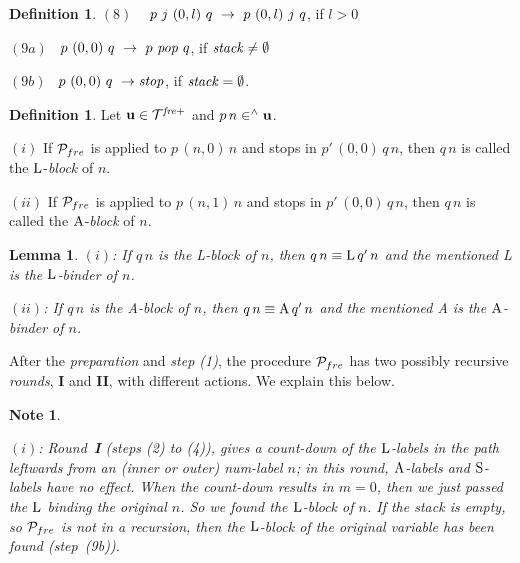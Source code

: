 \documentclass{article}
\theoremstyle{plain}
\newtheorem{Lem}[The]{Lemma}
\newtheorem{Note}[The]{Note}
\theoremstyle{definition}
\newtheorem{Def}[The]{Definition}
\begin{document}
{\begin{Def}
$(8)$ ~ $p ~ j ~ (0,l) ~ q ~ \rightarrow ~ p ~ (0,l) ~ j ~ q$, if $l > 0$

$(9a)$ \, $p ~ (0,0)  ~ q ~ \rightarrow ~ p ~ {\it pop}  ~ q$, if  ${\it stack} \not = \emptyset$

$(9b)$ \, $p ~ (0,0) ~ q ~ \rightarrow {\it stop}$, if ${\it stack} = \emptyset$.

\end{Def}




\begin{Def}\label{DefALBlo}
Let ${\bf u} \in {\cal T}^{\it fre+}$ and $p \, n \in^\wedge {\bf u}$.

$(i)$ If ${\cal P}_{fre}$ is applied to $p \, (n,0) \, n$ and stops in $p' \, (0,0) \, q \, n$, then $q \, n$ is called the ${\rm L}$-{\it block\/} of $n$.

$(ii)$ If ${\cal P}_{fre}$ is applied to $p \, (n,1) \, n$ and stops in $p' \, (0,0) \, q \, n$, then $q \, n$ is called the ${\rm A}$-{\it block\/} of $n$.
\end{Def}

\begin{Lem}\label{LemLblAbl}
$(i)$: If $q \, n$ is the {\rm L}-block of $n$, then $q \, n \equiv {\rm L} \, q' \, n$ and the mentioned {\rm L} is the ${\rm L}$-binder of $n$.

$(ii)$: If $q \, n$ is the {\rm A}-block of $n$, then $q \, n \equiv {\rm A} \, q' \, n$ and the mentioned {\rm A} is the ${\rm A}$-binder of $n$.
\end{Lem}

After the {\em preparation\/} and {\em step (1)}, the procedure ${\cal P}_{fre}$ has two possibly recursive {\it rounds\/}, {\bf I} and {\bf II}, with different actions. We explain this below.

\begin{Note}\label{ExpActPro}

$(i)$: Round~{\bf I} (steps (2) to (4)), gives a {\it count-down\/} of the ${\rm L}$-labels in the path leftwards from an (inner or outer) num-label $n$; in this round,
${\rm A}$-labels and ${\rm S}$-labels have no effect. When the count-down results in $m = 0$, then we just passed the ${\rm L}$ binding the original $n$. So we found the ${\rm L}$-block of $n$. If the stack is empty, so ${\cal P}_{fre}$ is not in a recursion, then the ${\rm L}$-block of the original variable has been found (step~(9b)).


\end{Note}}
\end{document}
